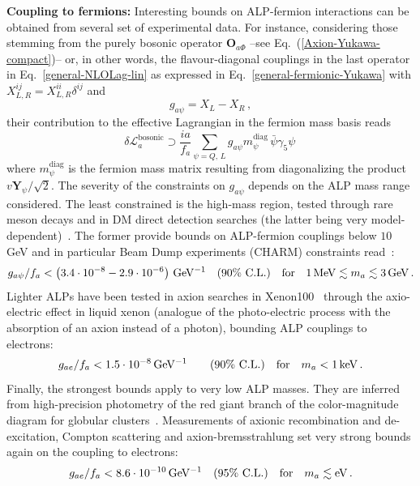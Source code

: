 \documentclass[11pt]{article}
\renewcommand{\O}{\mathbf{O}}
\newcommand{\cl}{\%\,\,  \text{C.L.}}
\newcommand{\beq}{\begin{equation}}
\newcommand{\eeq}{\end{equation}}
\renewcommand{\[}{\begin{equation}}
\renewcommand{\]}{\end{equation}}
\newcommand{\LL}{\mathscr{L}}
\newcounter{diagram}
\begin{document}
{\bf Coupling to fermions: } Interesting bounds on ALP-fermion interactions can be obtained from several set of experimental data. 
For instance, considering those stemming from the purely bosonic operator $\O_{a\Phi}$ --see Eq.~(\ref{Axion-Yukawa-compact})-- or, in other words, 
the flavour-diagonal couplings in the  last operator in Eq.~\eqref{general-NLOLag-lin} as expressed in Eq.~\eqref{general-fermionic-Yukawa} with $X_{L,R}^{ij}=X_{L,R}^{ii}\delta^{ij}$ and 
\beq
g_{a\psi}=X_{L}-X_{R}\, ,
\eeq
their contribution to the effective Lagrangian in the fermion mass basis reads
%
\[ 
\delta\LL_a^{\text{bosonic}} \supset   \frac{ia}{f_a}  \sum_{\psi=Q,\,L} g_{a\psi} m^{\text{diag}}_{\psi}\, \bar{\psi} \gamma_5 \psi \,
\]
%
where $m^{\text{diag}}_\psi$ is the fermion mass matrix resulting from diagonalizing the product $v \mathbf{Y}_\psi/\sqrt{2}$.  
The severity of the constraints on $g_{a\psi}$ depends on the ALP mass range considered. 
  The least constrained is the high-mass region, tested through rare meson decays and in DM direct detection  searches (the latter being very model-dependent)~\cite{Krnjaic:2015mbs}.  The former provide bounds on ALP-fermion couplings below $10$ GeV and in particular Beam Dump experiments (CHARM) constraints read~\cite{Bergsma:1985qz,Dolan:2014ska}:
\[\label{a-f-2}
g_{a\psi}/f_a < \unit[\left(3.4\cdot 10^{-8} - 2.9\cdot10^{-6}\right)]{GeV^{-1}} \quad(90\cl)  \quad \text{for}\quad \unit[1]{MeV}\lesssim m_a \lesssim \unit[3]{GeV}\,.
\]
Lighter ALPs have been tested in axion searches in Xenon100~\cite{Aprile:2014eoa} through the axio-electric effect in liquid xenon (analogue of the photo-electric process with the absorption of an axion instead of a photon), bounding ALP couplings to electrons: 
\[\label{a-f-3}
g_{ae}/f_a<\unit[1.5\cdot 10^{-8}]{GeV^{-1}}\quad\quad(90\cl)\quad \text{for}\quad  m_a<\unit[1]{keV}\,.
\]
Finally, the strongest bounds apply to very low ALP masses. They are inferred from high-precision photometry of the red giant branch of the color-magnitude diagram for globular clusters~\cite{Viaux:2013lha}. Measurements of axionic recombination and de-excitation, Compton scattering and axion-bremsstrahlung set very strong bounds again on the coupling to electrons:
\[\label{a-f-4}
g_{ae}/f_a < \unit[8.6\cdot 10^{-10}]{GeV^{-1}}\quad (95\cl) \quad \text{for}\quad m_a \lesssim \unit[]{eV}\,.
\]
\end{document}
